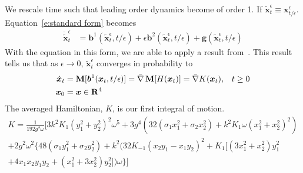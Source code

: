 We rescale time such that leading order dynamics become of order
1. If $\tilde{\boldsymbol{x}}_t^{\epsilon} \equiv
\boldsymbol{x}_{t/\epsilon}^{\epsilon}$. Equation~\eqref{e:standard
form} becomes
\begin{align*}
\dot{\tilde{\boldsymbol{x}}}^{\epsilon}_t& = \boldsymbol{b}^1
({\tilde{\boldsymbol{x}}}^{\epsilon}_t,t/\epsilon) + \epsilon
\boldsymbol{b}^2
({\tilde{\boldsymbol{x}}}^{\epsilon}_t,t/\epsilon) +
\boldsymbol{g} (\tilde{\boldsymbol{x}}^{\epsilon}_t,t/\epsilon)
\end{align*}
With the equation in this form, we are able to apply a result from~\citet{khasminskii66:_stoch_proc}. This result tells us that as $\epsilon \to 0$, $\tilde{\boldsymbol{x}}_t^\epsilon$ converges in probability to
\begin{align*}
\dot{\boldsymbol{x}}_t &= \operatorname{\mathbf M}[\boldsymbol{b}^1(\boldsymbol{x}_t,t/\epsilon)] = \bar{\nabla}\operatorname{\mathbf M}[H(\boldsymbol{x}_t)] = \bar{\nabla} K(\boldsymbol{x}_t), & t \geq 0\\
\boldsymbol{x}_0 &= \boldsymbol x \in \mathbf R^4
\end{align*}
The averaged Hamiltonian, $K$, is our first integral of motion.
\begin{multline*}
K =\frac{1}{192 g^3 \omega}\bigl[3 k^2 K_1 (y_1^2+y_2^2)^2
\omega^5 + 3g^4 (32(\sigma_1 x_1^2 + \sigma_2 x_2^2)+k^2 K_1 \omega
(x_1^2+x_2^2)^2)\\
+ 2g^2 \omega^2 \{48(\sigma_1 y_1^2 + \sigma_2 y_2^2) + k^2 (32 K_{-1}
(x_2 y_1-x_1 y_2)^2+K_1[(3 x_1^2+x_2^2) y_1^2 \\
+ 4 x_1 x_2 y_1 y_2 + (x_1^2 + 3 x_2^2) y_2^2])\omega\}\bigr]
\end{multline*}

